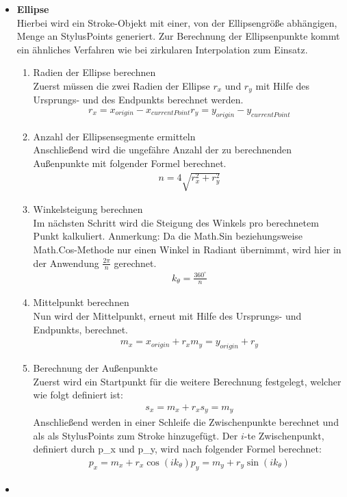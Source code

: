 \begin{itemize}
\item \textbf{Ellipse}\\ 
Hierbei wird ein Stroke-Objekt mit einer, von der Ellipsengröße abhängigen, Menge an StylusPoints generiert. Zur Berechnung der Ellipsenpunkte kommt ein ähnliches Verfahren wie bei zirkularen Interpolation zum Einsatz.
\begin{enumerate}
\item Radien der Ellipse berechnen\\
Zuerst müssen die zwei Radien der Ellipse $r_x$ und $r_y$ mit Hilfe des Ursprungs- und des Endpunkts berechnet werden.
\begin{align}
r_x = x_{origin} - x_{currentPoint}
r_y = y_{origin} - y_{currentPoint}
\end{align}
\item Anzahl der Ellipsensegmente ermitteln\\
Anschließend wird die ungefähre Anzahl der zu berechnenden Außenpunkte mit folgender Formel berechnet.
\begin{align}
n = 4 \sqrt{r_x^2+r_y^2}
\end{align}
\item Winkelsteigung berechnen\\
Im nächsten Schritt wird die Steigung des Winkels pro berechnetem Punkt kalkuliert.
Anmerkung: Da die Math.Sin beziehungsweise Math.Cos-Methode nur einen Winkel in Radiant übernimmt, wird hier in der Anwendung $\frac{2\pi}{n}$ gerechnet.
\begin{align}
k_{\theta} = \frac{360^\circ}{n}
\end{align}
\item Mittelpunkt berechnen\\
Nun wird der Mittelpunkt, erneut mit Hilfe des Ursprungs- und Endpunkts, berechnet.
\begin{align}
m_x = x_{origin} + r_x
m_y = y_{origin} + r_y
\end{align}
\item Berechnung der Außenpunkte\\
Zuerst wird ein Startpunkt für die weitere Berechnung festgelegt, welcher wie folgt definiert ist:
\begin{align}
s_x = m_x + r_x
s_y = m_y
\end{align}
Anschließend werden in einer Schleife die Zwischenpunkte berechnet und als als StylusPoints zum Stroke hinzugefügt. Der $i$-te Zwischenpunkt, definiert durch p_x und p_y, wird nach folgender Formel berechnet:
\begin{align}
p_x = m_x + r_x \cos(ik_\theta)
p_y = m_y + r_y \sin(ik_\theta)
\end{align}
\end{enumerate}

\item
\end{itemize}
